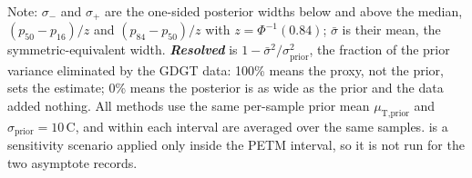 \begin{table}[h]
\vspace{2pt}
\begin{minipage}{0.95\linewidth}\footnotesize
Note: $\sigma_-$ and $\sigma_+$ are the one-sided posterior widths below and above the median, $(p_{50}-p_{16})/z$ and $(p_{84}-p_{50})/z$ with $z=\Phi^{-1}(0.84)$; $\bar{\sigma}$ is their mean, the symmetric-equivalent width. \textbf{\emph{Resolved}} is $1-\bar{\sigma}^{2}/\sigma_{\text{prior}}^{2}$, the fraction of the prior variance eliminated by the GDGT data: 100\% means the proxy, not the prior, sets the estimate; 0\% means the posterior is as wide as the prior and the data added nothing. All methods use the same per-sample prior mean $\mu_{\text{T,prior}}$ and $\sigma_{\text{prior}}=10$\,\degree C, and within each interval are averaged over the same samples.  is a sensitivity scenario applied only inside the PETM interval, so it is not run for the two asymptote records.
\end{minipage}
\end{table}
